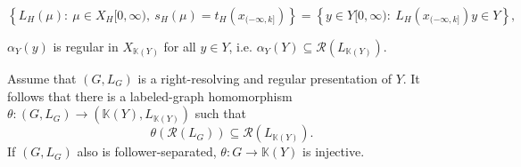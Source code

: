 \documentclass[10pt,a4paper]{amsart}
\begin{document}
\begin{equation}\label{02-09-25ax}
\left\{ L_H(\mu) : \ \mu \in X_H[0,\infty), \ s_H(\mu)  = 
t_H(x_{(-\infty, k]})\right\} = \left\{ y \in Y[0,\infty): \ L_H(x_{(-\infty,k]})y \in Y \right\}, 
\end{equation}

\begin{lemma}\label{11-09-25g} $\alpha_Y(y)$ is regular in $X_{\mathbb K(Y)}$ for all $y \in Y$, i.e.
$\alpha_Y(Y) \subseteq \mathcal R(L_{\mathbb K(Y)})$.
\end{lemma}

\begin{lemma}\label{02-09-25dx} Assume that $(G,L_G)$ is a right-resolving and regular presentation of $Y$. It follows that there is a labeled-graph homomorphism $\theta : (G,L_G) \to (\mathbb K(Y), L_{\mathbb K(Y)})$ such that
$$
\theta\left(\mathcal R(L_G)\right) \subseteq \mathcal R(L_{\mathbb K(Y)}).
$$
If $(G,L_G)$ also is follower-separated, $\theta : G \to \mathbb K(Y)$ is injective.
\end{lemma}
\end{document}
